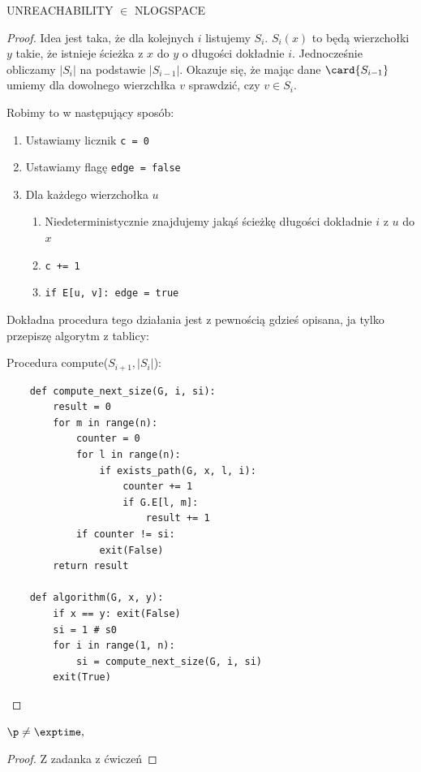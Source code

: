 \begin{theorem}
	\textsc{UNREACHABILITY} \(\in\) \textsc{NLOGSPACE}
\end{theorem}
\begin{proof}
	Idea jest taka, że dla kolejnych \( i \) listujemy \(S_i\). \(S_i(x)\) to będą wierzchołki \(y\) takie, że istnieje ścieżka z \(x\) do \(y\) o długości dokładnie \(i\).  Jednocześnie obliczamy \(|S_i|\) na podstawie \(|S_{i-1}|\).
	Okazuje się, że mając dane \( \card{S_{i - 1}} \) umiemy dla dowolnego wierzchłka \( v \) sprawdzić, czy \( v \in S_i \).

	Robimy to w następujący sposób:
	\begin{enumerate}
		\item Ustawiamy licznik \texttt{c = 0}
		\item Ustawiamy flagę \texttt{edge = false}
		\item Dla każdego wierzchołka \( u \)
		      \begin{enumerate}
			      \item Niedeterministycznie znajdujemy jakąś ścieżkę długości dokładnie \( i \) z \( u \) do \( x \)
			      \item \texttt{c += 1}
			      \item \texttt{if E[u, v]: edge = true}
		      \end{enumerate}
	\end{enumerate}


	Dokładna procedura tego działania jest z pewnością gdzieś opisana, ja tylko przepiszę algorytm z tablicy:

	Procedura compute(\(S_{i+1}, |S_i|\)):

	\begin{verbatim}
    def compute_next_size(G, i, si):
        result = 0
        for m in range(n):
            counter = 0
            for l in range(n):
                if exists_path(G, x, l, i):
                    counter += 1
                    if G.E[l, m]:
                        result += 1
            if counter != si:
                exit(False)
        return result
        
    def algorithm(G, x, y):
        if x == y: exit(False)
        si = 1 # s0
        for i in range(1, n):
            si = compute_next_size(G, i, si)
        exit(True)
    \end{verbatim}
\end{proof}

\begin{theorem}
	\(\p \neq  \exptime, \)
\end{theorem}
\begin{proof}
	Z zadanka z ćwiczeń
\end{proof}